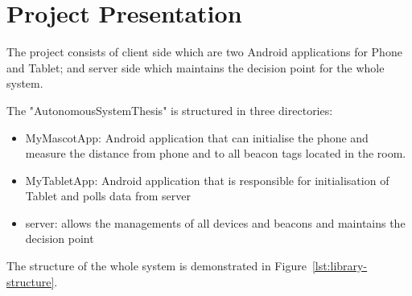 \section{Project Presentation}
\label{sec:project-presentation}
The project consists of client side which are two Android applications for Phone and Tablet;
and server side which maintains the decision point for the whole system.

The "AutonomousSystemThesis" is structured in three directories:

\begin{itemize}
    \item MyMascotApp: Android application that can initialise the phone and measure the distance
            from phone and to all beacon tags located in the room.
    \item MyTabletApp: Android application that is responsible for initialisation of Tablet and polls data from server
    \item server: allows the managements of all devices and beacons and maintains the decision point
\end{itemize}

The structure of the whole system is demonstrated in Figure~\ref{lst:library-structure}.


